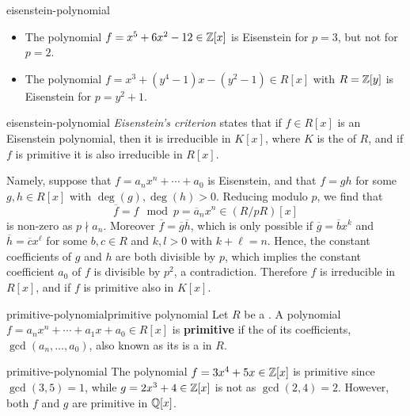 \begin{example}{eisenstein-polynomial}
    \begin{itemize}
        \item The polynomial $f = x^5 + 6x^2 - 12 \in \mathbb{Z}[x]$ is Eisenstein for $p = 3$, but not for $p = 2$.
        \item The polynomial $f = x^3 + (y^4 - 1) x - (y^2 - 1) \in R[x]$ with $R = \mathbb{Z}[y]$ is Eisenstein for $p = y^2 + 1$.
    \end{itemize}
\end{example}

\begin{example}{eisenstein-polynomial}
    \textit{Eisenstein's criterion} states that if $f \in R[x]$ is an Eisenstein polynomial, then it is irreducible in $K[x]$, where $K$ is the  of $R$, and if $f$ is primitive it is also irreducible in $R[x]$.
    
    Namely, suppose that $f = a_n x^n + \cdots + a_0$ is Eisenstein, and that $f = gh$ for some $g, h \in R[x]$ with $\deg(g), \deg(h) > 0$. Reducing modulo $p$, we find that
    \[ \overline{f} = f \mod p = \overline{a}_n x^n \in (R/pR)[x] \]
    is non-zero as $p \nmid a_n$. Moreover $\overline{f} = \overline{g} \overline{h}$, which is only possible if $\overline{g} = \overline{b} x^k$ and $\overline{h} = \overline{c} x^\ell$ for some $b, c \in R$ and $k, l > 0$ with $k + \ell = n$. Hence, the constant coefficients of $g$ and $h$ are both divisible by $p$, which implies the constant coefficient $a_0$ of $f$ is divisible by $p^2$, a contradiction. Therefore $f$ is irreducible in $R[x]$, and if $f$ is primitive also in $K[x]$.
\end{example}

\begin{topic}{primitive-polynomial}{primitive polynomial}
    Let $R$ be a . A polynomial $f = a_n x^n + \cdots + a_1 x + a_0 \in R[x]$ is \textbf{primitive} if the  of its coefficients, $\gcd(a_n, \ldots, a_0)$, also known as its  is a  in $R$.
\end{topic}

\begin{example}{primitive-polynomial}
    The polynomial $f = 3x^4 + 5x \in \mathbb{Z}[x]$ is primitive since $\gcd(3, 5) = 1$, while $g = 2x^3 + 4 \in \mathbb{Z}[x]$ is not as $\gcd(2, 4) = 2$. However, both $f$ and $g$ are primitive in $\mathbb{Q}[x]$.
\end{example}

